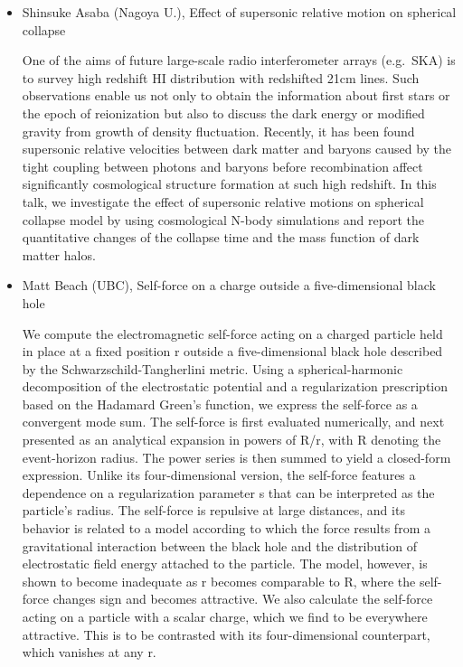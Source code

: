 \documentclass[letterpaper,12pt]{article}
\newcommand{\talk}[2]{{\fontspec{Lato Bold} #1,} {\fontspec{Lato Italic} #2}}
\begin{document}
\begin{itemize}
\setlength\itemsep{0pt}

\item \talk{Shinsuke Asaba (Nagoya U.)}{Effect of supersonic relative motion on spherical collapse}

One of the aims of future large-scale radio interferometer arrays (e.g.\ SKA) is to survey high redshift HI distribution with redshifted 21cm lines. Such observations enable us not only to obtain the information about first stars or the epoch of reionization but also to discuss the dark energy or modified gravity from growth of density fluctuation. Recently, it has been found supersonic relative velocities between dark matter and baryons caused by the tight coupling between photons and baryons before recombination affect significantly cosmological structure formation at such high redshift. In this talk, we investigate the effect of supersonic relative motions on spherical collapse model by using cosmological N-body simulations and report the quantitative changes of the collapse time and the mass function of dark matter halos.

\item \talk{Matt Beach (UBC)}{Self-force on a charge outside a five-dimensional black hole}

We compute the electromagnetic self-force acting on a charged particle held in place at a fixed position r outside a five-dimensional black hole described by the Schwarzschild-Tangherlini metric. Using a spherical-harmonic decomposition of the electrostatic potential and a regularization prescription based on the Hadamard Green's function, we express the self-force as a convergent mode sum. The self-force is first evaluated numerically, and next presented as an analytical expansion in powers of R/r, with R denoting the event-horizon radius. The power series is then summed to yield a closed-form expression. Unlike its four-dimensional version, the self-force features a dependence on a regularization parameter s that can be interpreted as the particle's radius. The self-force is repulsive at large distances, and its behavior is related to a model according to which the force results from a gravitational interaction between the black hole and the distribution of electrostatic field energy attached to the particle. The model, however, is shown to become inadequate as r becomes comparable to R, where the self-force changes sign and becomes attractive. We also calculate the self-force acting on a particle with a scalar charge, which we find to be everywhere attractive. This is to be contrasted with its four-dimensional counterpart, which vanishes at any r. 


\end{itemize}
\end{document}
